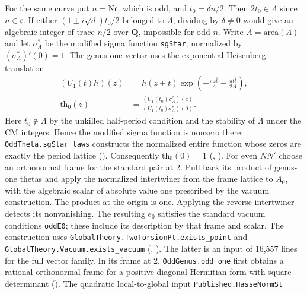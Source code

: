 For the same curve put \(n=\mathrm N\mathfrak c\), which is odd, and
\(t_0=\delta n/2\). Then \(2t_0\in\Lambda\) since \(n\in\mathfrak c\).
If either \((1\pm i\sqrt d)t_0/2\) belonged to \(\Lambda\), dividing
by \(\delta\ne0\) would give an algebraic integer of trace \(n/2\)
over \(\mathbf Q\), impossible for odd \(n\). Write
\(A=\mathrm{area}(\Lambda)\) and let \(\sigma^*_\Lambda\) be the modified
sigma function \nolinkurl{sgStar}, normalized by \((\sigma^*_\Lambda)'(0)=1\).
The genus-one vector uses the exponential Heisenberg translation
\[
 \begin{aligned}
 (U_1(t)h)(z)
    &=h(z+t)\exp\!\left(-\frac{\pi z\overline t}{A}
                          -\frac{\pi t\overline t}{2A}\right),\\
 \mathrm{th}_0(z)
    &=\frac{(U_1(t_0)\sigma^*_\Lambda)(z)}
            {(U_1(t_0)\sigma^*_\Lambda)(0)} .
 \end{aligned}
\]
Here \(t_0\notin\Lambda\) by the unkilled half-period condition and
the stability of \(\Lambda\) under the CM integers. Hence the modified
sigma function is nonzero there: \nolinkurl{OddTheta.sgStar_laws}
constructs the normalized entire function whose zeros are exactly the
period lattice ().
Consequently \(\mathrm{th}_0(0)=1\)
(,
).
For even \(NN'\) choose an orthonormal
frame for the standard pair at 2. Pull back its product of genus-one
thetas and apply the normalized intertwiner from the frame lattice
to \(A_0\), with the algebraic scalar of absolute value one prescribed
by the vacuum construction. The product at the origin is one.
Applying the reverse intertwiner detects its nonvanishing. The resulting
\(e_0\) satisfies the standard vacuum conditions \nolinkurl{oddE0};
these include its description by that frame and scalar. The construction
uses \nolinkurl{GlobalTheory.TwoTorsionPt.exists_point} and
\nolinkurl{GlobalTheory.Vacuum.exists_vacuum}
(,
).
The latter is an input of 16,557 lines for the full vector family.
In its frame at 2, \nolinkurl{OddGenus.odd_one} first obtains a rational
orthonormal frame for a positive diagonal Hermitian form with square
determinant ().
The quadratic local-to-global input \nolinkurl{Published.HasseNormSt}
